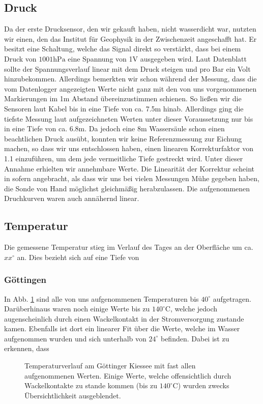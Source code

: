 \documentclass[12pt,a4paper,titlepage,headinclude,bibtotoc]{scrartcl}
\begin{document}
\subsection{Druck}
Da der erste Drucksensor, den wir gekauft haben, nicht wasserdicht war, nutzten wir einen, den das Institut für Geophysik in der Zwischenzeit angeschafft hat.
Er besitzt eine Schaltung, welche das Signal direkt so verstärkt, dass bei einem Druck von $1001\si{\hecto\pascal}$ eine Spannung von 1V ausgegeben wird.
Laut Datenblatt sollte der Spannungsverlauf linear mit dem Druck steigen und pro Bar ein Volt hinzubekommen.
Allerdings bemerkten wir schon während der Messung, dass die vom Datenlogger angezeigten Werte nicht ganz mit den von uns vorgenommenen Markierungen im 1m Abstand übereinzustimmen schienen.
So ließen wir die Sensoren laut Kabel bis in eine Tiefe von ca. 7.5m hinab.
Allerdings ging die tiefste Messung laut aufgezeichneten Werten unter dieser Voraussetzung nur bis in eine Tiefe von ca. 6.8m.
Da jedoch eine 8m Wassersäule schon einen beachtlichen Druck ausübt, konnten wir keine Referenzmessung zur Eichung machen, so dass wir uns entschlossen haben, einen linearen Korrekturfaktor von 1.1 einzuführen, um dem jede vermeitliche Tiefe gestreckt wird.
Unter dieser Annahme erhielten wir annehmbare Werte.
Die Linearität der Korrektur scheint in sofern angebracht, als dass wir uns bei vielen Messungen Mühe gegeben haben, die Sonde von Hand möglichst gleichmäßig herabzulassen.
Die aufgenommenen Druchkurven waren auch annähernd linear.


\subsection{Temperatur}
Die gemessene Temperatur stieg im Verlauf des Tages an der Oberfläche um ca. $xx^\circ$ an.
Dies bezieht sich auf eine Tiefe von  

\subsubsection{Göttingen}
In Abb. \ref{fig:temp_goe} sind alle von uns aufgenommenen Temperaturen bis $40^\circ$ aufgetragen.
Darüberhinaus waren noch einige Werte bis zu $140^\circ$C, welche jedoch augenscheinlich durch einen Wackelkontakt in der Stromversorgung zustande kamen.
Ebenfalls ist dort ein linearer Fit über die Werte, welche im Wasser aufgenommen wurden und sich unterhalb von $24^\circ$ befinden.
Dabei ist zu erkennen, dass

\begin{figure}[h]
\centering

\caption{Temperaturverlauf am Göttinger Kiessee mit fast allen aufgenommenen Werten. Einige Werte, welche offensichtlich durch Wackelkontakte zu stande kommen (bis zu $140^\circ$C) wurden zwecks Übersichtlichkeit ausgeblendet.}
\label{fig:temp_goe}
\end{figure}
\end{document}

